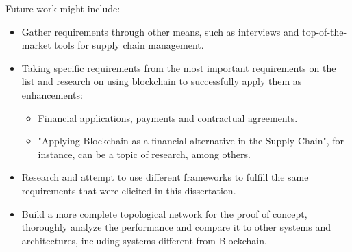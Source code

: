 Future work might include:
\begin{itemize}
	\item Gather requirements through other means, such as interviews and top-of-the-market tools for supply chain management.
	\item Taking specific requirements from the most important requirements on the list and research on using blockchain to successfully apply them as enhancements:
	\begin{itemize}
		\item Financial applications, payments and contractual agreements.
		\item "Applying Blockchain as a financial alternative in the Supply Chain", for instance, can be a topic of research, among others.
	\end{itemize}
	\item Research and attempt to use different frameworks to fulfill the same requirements that were elicited in this dissertation.
	\item Build a more complete topological network for the proof of concept, thoroughly analyze the performance and compare it to other systems and architectures, including systems different from Blockchain.
	
\end{itemize} 


%

